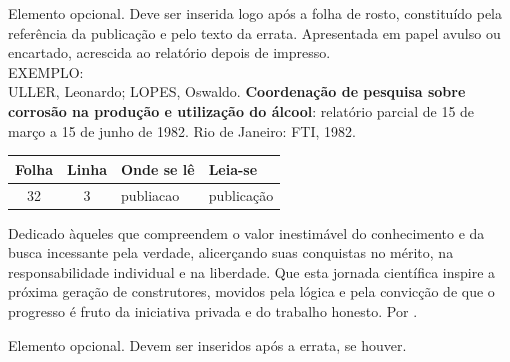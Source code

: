 \documentclass{Arquivos/TrabalhoAcademico}
\begin{document}
\nocite{*}


\pretextual %


\folhaderosto
\contracapa


\fichaCatalografica


\begin{errata}
\noindent Elemento opcional. Deve ser inserida logo após a folha de rosto, constituído pela referência da publicação e pelo texto da errata. Apresentada em papel avulso ou encartado, acrescida ao relatório depois de impresso.\\[1em]

\noindent EXEMPLO:\\[1em]

\noindent ULLER, Leonardo; LOPES, Oswaldo. \textbf{Coordenação de pesquisa sobre corrosão na produção e utilização do álcool}: relatório parcial de 15 de março a 15 de junho de 1982. Rio de Janeiro: FTI, 1982.\\[1em]

\renewcommand{\arraystretch}{1.5}
\begin{center}
    \begin{tabular}{|c|c|l|l|}
        \hline
        Folha & Linha & Onde se lê & Leia-se \\
        \hline
        32 & 3 & publiacao & publicação \\
        \hline
    \end{tabular}
\end{center}
\end{errata}



\folhadeaprovacao{\today}


\begin{dedicatoria}
    Dedicado àqueles que compreendem o valor
    inestimável do conhecimento e da busca incessante
    pela verdade, alicerçando suas conquistas no mérito,
    na responsabilidade individual e na liberdade.
    Que esta jornada científica inspire a próxima
    geração de construtores, movidos pela lógica
    e pela convicção de que o progresso 
    é fruto da iniciativa privada e do 
    trabalho honesto. Por \textbf{\WenesTex}.
\end{dedicatoria}



Elemento opcional. Devem ser inseridos após a errata, se houver.
\end{document}
